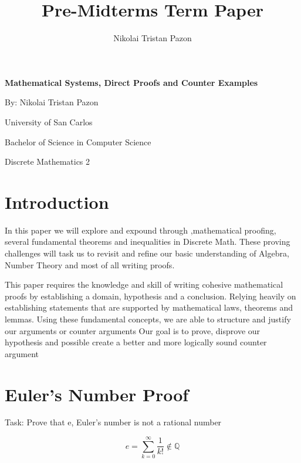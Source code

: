 \documentclass[12pt, a4paper]{article}
\begin{document}
\title{Pre-Midterms Term Paper}
\author{Nikolai Tristan Pazon}

\begin{titlepage}
    \centering
    \vspace*{1cm}
    {\Huge \bfseries Mathematical Systems, Direct Proofs and Counter Examples \par}
    \vspace{1cm}
    {\large By: Nikolai Tristan Pazon \par}
    \vspace{1cm}
    {\large University of San Carlos \par}
    \vspace{1cm}
    {\large Bachelor of Science in Computer Science \par}
    \vspace{0.25cm}
    {\large Discrete Mathematics 2\par}
    

\end{titlepage}

\section{Introduction}

\hspace{0.5cm} In this paper we will explore and expound through ,mathematical proofing, several fundamental
 theorems and inequalities in Discrete Math. These proving challenges will task us to revisit and refine our basic understanding of Algebra, Number Theory and most of all writing proofs.

\vspace{1cm}
This paper requires the knowledge and skill of writing cohesive mathematical proofs by establishing 
a domain, hypothesis and a conclusion. Relying heavily on establishing statements that are supported by mathematical laws, theorems
%
and lemmas. Using these fundamental concepts, we are able to structure and justify our arguments or counter arguments
%
Our goal is to prove, disprove our hypothesis and possible create a better and more logically sound counter argument

\section{Euler's Number Proof}
\centering
Task: Prove that e, Euler's number is not a rational number 



\vspace{0.5cm}
{\fontsize{17.28pt}{18pt}\selectfont
\[
e = \sum_{k=0}^\infty \frac{1}{k!} \notin \mathbb{Q}
\]
}
\end{document}
